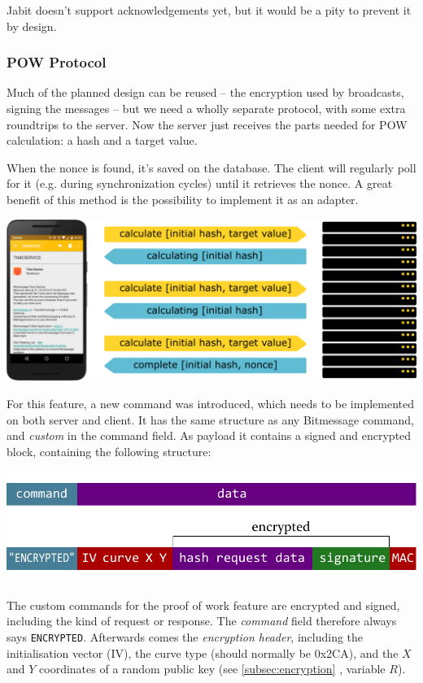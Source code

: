 \documentclass{bfh}
\begin{document}
  Jabit doesn't support acknowledgements yet, but it would be a pity to prevent it by design.

  \subsubsection{\ac{POW} Protocol}
  Much of the planned design can be reused -- the encryption used by broadcasts, signing the messages -- but we need a wholly separate protocol, with some extra roundtrips to the server. Now the server just receives the parts needed for \ac{POW} calculation: a hash and a target value.

  When the nonce is found, it's saved on the database. The client will regularly poll for it (e.g. during synchronization cycles) until it retrieves the nonce. A great benefit of this method is the possibility to implement it as an adapter.

  \includegraphics[width=\textwidth]{images/server_pow_protocol.pdf}

  For this feature, a new command was introduced, which needs to be implemented on both server and client. It has the same structure as any Bitmessage command, and \textit{custom} in the command field. As payload it contains a signed and encrypted block, containing the following structure:

  \includegraphics[width=\textwidth]{images/custom_message.pdf}

  The custom commands for the proof of work feature are encrypted and signed, including the kind of request or response. The \textit{command} field therefore always says \texttt{ENCRYPTED}. Afterwards comes the \textit{encryption header}, including the initialisation vector (IV), the curve type (should normally be 0x2CA), and the $X$ and $Y$ coordinates of a random public key (see \ref{subsec:encryption} , variable $R$).
\end{document}
